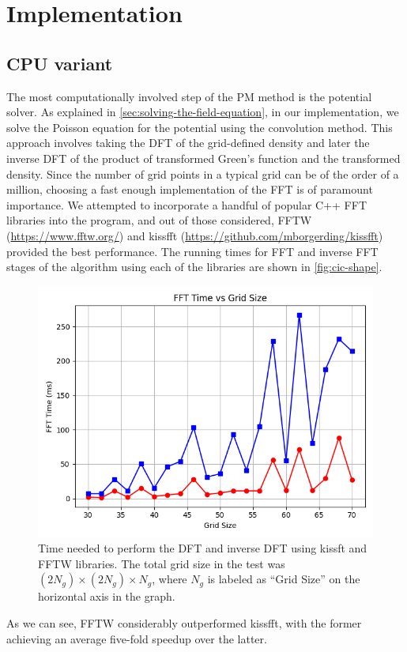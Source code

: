 \section{Implementation}
\subsection{CPU variant}
The most computationally involved step of the PM method is the potential solver.
As explained in \autoref{sec:solving-the-field-equation}, in our implementation, we solve the Poisson equation for the potential using the convolution method.
This approach involves taking the DFT of the grid-defined density and later the inverse DFT of the product of transformed Green's function and the transformed density.
Since the number of grid points in a typical grid can be of the order of a million, choosing a fast enough implementation of the FFT is of paramount importance.
We attempted to incorporate a handful of popular C++ FFT libraries into the program, and out of those considered, FFTW (\url{https://www.fftw.org/}) and kissfft (\url{https://github.com/mborgerding/kissfft}) provided the best performance.
The running times for FFT and inverse FFT stages of the algorithm using each of the libraries are shown in \autoref{fig:cic-shape}.
\begin{figure}[htp]
    \centering
    \includegraphics[scale=0.5]{chapters/pm-method/img/fft_time.png}
    \caption{Time needed to perform the DFT and inverse DFT using kissft and FFTW libraries.
        The total grid size in the test was $(2N_g)\times (2N_g) \times N_g$, where $N_g$ is labeled as ``Grid Size'' on the horizontal axis in the graph.}
    \label{fig:fft-time}
\end{figure}
As we can see, FFTW considerably outperformed kissfft, with the former achieving an average five-fold speedup over the latter.

